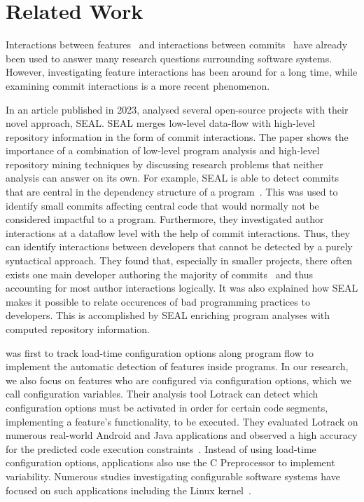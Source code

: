 \chapter{Related Work}\label{ch:related_work}

Interactions between features~\cite{lillack2014tracking,kolesnikov2017relation} and interactions between commits~\cite{sattler2023seal} have already been used to answer many research questions surrounding software systems.
However, investigating feature interactions has been around for a long time, while examining commit interactions is a more recent phenomenon. 

In an article published in 2023, \citet{sattler2023seal} analysed several open-source projects with their novel approach, SEAL.
SEAL merges low-level data-flow with high-level repository information in the form of commit interactions.
The paper shows the importance of a combination of low-level program analysis and high-level repository mining techniques by discussing research problems that neither analysis can answer on its own.
For example, SEAL is able to detect commits that are central in the dependency structure of a program~\cite{sattler2023seal}.
This was used to identify small commits affecting central code that would normally not be considered impactful to a program.
Furthermore, they investigated author interactions at a dataflow level with the help of commit interactions.
Thus, they can identify interactions between developers that cannot be detected by a purely syntactical approach.
They found that, especially in smaller projects, there often exists one main developer authoring the majority of commits~\cite{sattler2023seal} and thus accounting for most author interactions logically. 
It was also explained how SEAL makes it possible to relate occurences of bad programming practices to developers. 
This is accomplished by SEAL enriching program analyses with computed repository information. 

\citet{lillack2014tracking} was first to track load-time configuration options along program flow to implement the automatic detection of features inside programs.
In our research, we also focus on features who are configured via configuration options, which we call configuration variables. 
Their analysis tool Lotrack can detect which configuration options must be activated in order for certain code segments, implementing a feature's functionality, to be executed.
They evaluated Lotrack on numerous real-world Android and Java applications and observed a high accuracy for the predicted code execution constraints~\cite{lillack2014tracking}.
Instead of using load-time configuration options, applications also use the C Preprocessor to implement variability.
Numerous studies investigating configurable software systems have focused on such applications including the Linux kernel~\cite{passos2021scattering,michelon2021lifecycle}.

